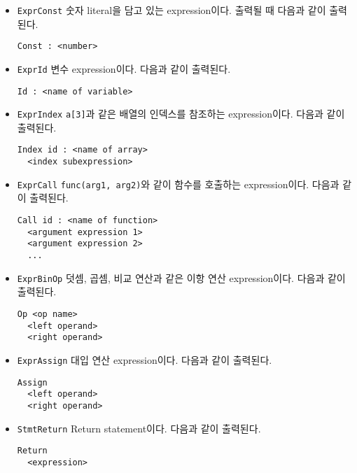 \documentclass[a4paper, 10pt]{oblivoir}
\begin{document}
\begin{itemize}
\item \texttt{ExprConst} \newline
숫자 literal을 담고 있는 expression이다. 출력될 때 다음과 같이 출력된다.
\begin{lstlisting}[frame=single]
Const : <number>
\end{lstlisting}

\item \texttt{ExprId} \newline
변수 expression이다. 다음과 같이 출력된다.
\begin{lstlisting}[frame=single]
Id : <name of variable>
\end{lstlisting}

\item \texttt{ExprIndex} \newline
\texttt{a[3]}과 같은 배열의 인덱스를 참조하는 expression이다. 다음과 같이 출력된다.
\begin{lstlisting}[frame=single]
Index id : <name of array>
  <index subexpression>
\end{lstlisting}

\item \texttt{ExprCall} \newline
\texttt{func(arg1, arg2)}와 같이 함수를 호출하는 expression이다. 다음과 같이 출력된다.
\begin{lstlisting}[frame=single]
Call id : <name of function>
  <argument expression 1> 
  <argument expression 2> 
  ...
\end{lstlisting}
 
\item \texttt{ExprBinOp} \newline
덧셈, 곱셈, 비교 연산과 같은 이항 연산 expression이다. 다음과 같이 출력된다.
\begin{lstlisting}[frame=single]
Op <op name>
  <left operand>
  <right operand>
\end{lstlisting}

\item \texttt{ExprAssign} \newline
대입 연산 expression이다. 다음과 같이 출력된다.
\begin{lstlisting}[frame=single]
Assign
  <left operand>
  <right operand>
\end{lstlisting}

\item \texttt{StmtReturn} \newline
Return statement이다. 다음과 같이 출력된다.
\begin{lstlisting}[frame=single]
Return
  <expression>
\end{lstlisting}


\end{itemize}
\end{document}
